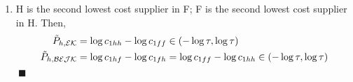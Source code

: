 \documentclass[12pt,dvips, ps2pdf]{article}
\begin{document}
\begin{appendix}
\begin{enumerate}
\begin{enumerate}
\item H is the second lowest cost supplier in F; F is the second lowest cost supplier in H. Then,
\begin{align}
\tilde P_{h, \mathcal{EK}}&=\log c_{1hh}-\log c_{1ff}\in(-\log\tau,\log\tau)\notag\\
\tilde P_{h, \mathcal{BEJK}}&=\log c_{1hf}-\log c_{1fh}=\log c_{1ff}-\log c_{1hh}\in(-\log\tau,\log\tau)\notag
\end{align} $\ \blacksquare$

\end{enumerate}


\end{enumerate}

%
%
%
%
%

\end{appendix}
\end{document}
